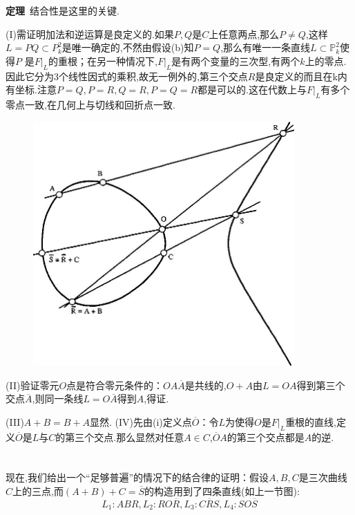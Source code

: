 \documentclass[UTF8]{book}
\begin{document}
		\textbf{定理}\ 结合性是这里的关键.
		
		
		(I)需证明加法和逆运算是良定义的.如果$ P,Q $是$ C $上任意两点,那么$ P \ne Q $,这样$L=PQ\subset P^{2}_{k}$是唯一确定的,不然由假设(b)知$ P=Q $,那么有唯一一条直线$L\subset \mathbb{P}^{2}_{k}$使得$ P $ 是$F|_{L}$的重根；在另一种情况下,$F|_{L}$是有两个变量的三次型,有两个$ k $上的零点.因此它分为3个线性因式的乘积,故无一例外的,第三个交点$ R $是良定义的而且在k内有坐标.注意$ P=Q,P=R,Q=R,P=Q=R $都是可以的.这在代数上与$F|_{L}$有多个零点一致,在几何上与切线和回折点一致.
		
		
		\begin{figure}[H]
		  \centering
		  \includegraphics[width=10cm]{34.jpg}
		\end{figure}
		(II)验证零元$ O $点是符合零元条件的：$OA\overline{A}$是共线的,$ O+A $由$ L=OA $得到第三个交点$\overline{A}$,则同一条线$L=O\overline{A}$得到$ A $,得证.
		
		
		(III)$ A+B=B+A $显然.
		(IV)先由(i)定义点$\overline{O}$：令$ L $为使得$ O $是$F|_{L}$重根的直线,定义$\overline{O}$是$ L $与$ C $的第三个交点.那么显然对任意$ A \in C $,$\overline{O} A$的第三个交点都是$ A  $的逆.
	\section{}
		现在,我们给出一个“足够普遍”的情况下的结合律的证明：假设$ A,B,C $是三次曲线$ C $上的三点,而$(A+B)+C=\overline{S}$的构造用到了四条直线(如上一节图):
		\begin{equation*}
			L_{1}:ABR,L_{2}:RO\overline{R},L_{3}:C\overline{R}S,L_{4}:SO\overline{S}
		\end{equation*}
	
\end{document}
